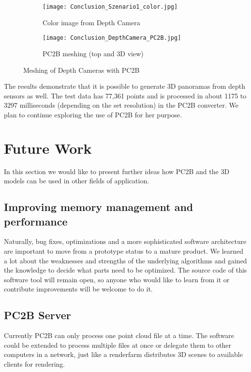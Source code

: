 \begin{figure}[h]
	\centering
	\begin{subfigure}[b]{0.4\textwidth}
		\centering
		\texttt{[image: Conclusion\_Szenario1\_color.jpg]}
		\caption{Color image from Depth Camera}
		\label{fig:conclusion_depth_camera_color}
	\end{subfigure}
	\hfill
	\begin{subfigure}[b]{0.59\textwidth}
		\centering
		\texttt{[image: Conclusion\_DepthCamera\_PC2B.jpg]}
		\caption{PC2B meshing (top and 3D view)}
		\label{fig:conclusion_depth_camera_pc2b}
	\end{subfigure}
	\caption{Meshing of Depth Cameras with PC2B}
	\label{fig:conclusion_depth_camera_meshing}
\end{figure}

The results demonstrate that it is possible to generate 3D panoramas from depth sensors as well. The test data has 77,361 points and is processed in about 1175 to 3297 milliseconds (depending on the set resolution) in the PC2B converter. We plan to continue exploring the use of PC2B for her purpose.

\section{Future Work}

In this section we would like to present further ideas how PC2B and the 3D models can be used in other fields of application.

\subsection{Improving memory management and performance}

Naturally, bug fixes, optimizations and a more sophisticated software architecture are important to move from a prototype status to a mature product. We learned a lot about the weaknesses and strengths of the underlying algorithms and gained the knowledge to decide what parts need to be optimized. The source code of this software tool will remain open, so anyone who would like to learn from it or contribute improvements will be welcome to do it.

\subsection{PC2B Server}

Currently PC2B can only process one point cloud file at a time. The software could be extended to process multiple files at once or delegate them to other computers in a network, just like a renderfarm distributes 3D scenes to available clients for rendering.

